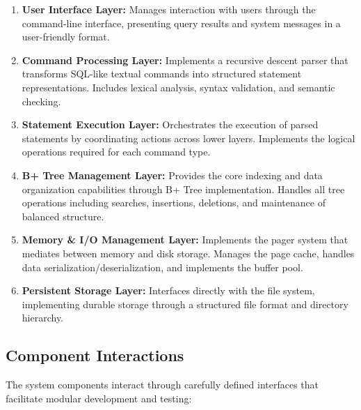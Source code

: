 \documentclass[12pt,a4paper]{article}  %
\begin{document}
\begin{enumerate}
    \item \textbf{User Interface Layer:} Manages interaction with users through the command-line interface, presenting query results and system messages in a user-friendly format.
    
    \item \textbf{Command Processing Layer:} Implements a recursive descent parser that transforms SQL-like textual commands into structured statement representations. Includes lexical analysis, syntax validation, and semantic checking.
    
    \item \textbf{Statement Execution Layer:} Orchestrates the execution of parsed statements by coordinating actions across lower layers. Implements the logical operations required for each command type.
    
    \item \textbf{B+ Tree Management Layer:} Provides the core indexing and data organization capabilities through B+ Tree implementation. Handles all tree operations including searches, insertions, deletions, and maintenance of balanced structure.
    
    \item \textbf{Memory \& I/O Management Layer:} Implements the pager system that mediates between memory and disk storage. Manages the page cache, handles data serialization/deserialization, and implements the buffer pool.
    
    \item \textbf{Persistent Storage Layer:} Interfaces directly with the file system, implementing durable storage through a structured file format and directory hierarchy.
\end{enumerate}

\subsection{Component Interactions}

The system components interact through carefully defined interfaces that facilitate modular development and testing:
\end{document}
